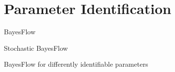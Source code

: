 \section{Parameter Identification}
\label{sec:methods:parameter_identification}

BayesFlow

Stochastic BayesFlow

BayesFlow for differently identifiable parameters
